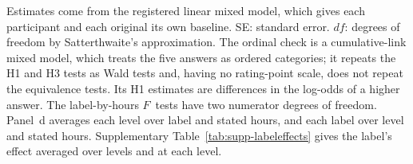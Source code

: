 \begin{table}[htbp]
\smallskip
\begin{minipage}{\textwidth}
\footnotesize\raggedright
Estimates come from the registered linear mixed model, which gives each participant and each original its own baseline. SE: standard error. $df$: degrees of freedom by Satterthwaite's approximation. The ordinal check is a cumulative-link mixed model, which treats the five answers as ordered categories; it repeats the H1 and H3 tests as Wald tests and, having no rating-point scale, does not repeat the equivalence tests. Its H1 estimates are differences in the log-odds of a higher answer. The label-by-hours $F$~tests have two numerator degrees of freedom. Panel~d averages each level over label and stated hours, and each label over level and stated hours. Supplementary Table~\ref{tab:supp-labeleffects} gives the label's effect averaged over levels and at each level.
\end{minipage}
\end{table}
